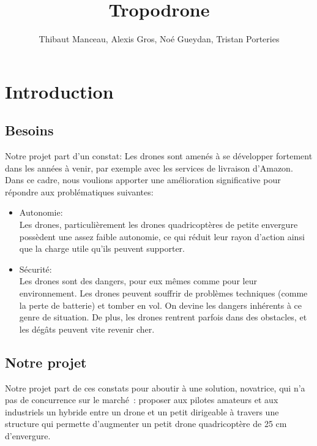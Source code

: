 \documentclass[a4paper,11pt]{article}
\title{Tropodrone}
\author{Thibaut Manceau, Alexis Gros, Noé Gueydan, Tristan Porteries}
\begin{document}
\begin{Huge}
\maketitle
\end{Huge}

\clearpage

\tableofcontents

\clearpage

\section{Introduction}

\subsection{Besoins}
Notre projet part d'un constat: Les drones sont amenés à se développer fortement dans les années à venir, par exemple avec les services de livraison d'Amazon. Dans ce cadre, nous voulions apporter une amélioration significative pour répondre aux problématiques suivantes:
\begin{itemize}
	\item Autonomie: \\
		Les drones, particulièrement les drones quadricoptères de petite envergure possèdent une assez faible autonomie, ce qui réduit leur rayon d'action ainsi que la charge utile qu'ils peuvent supporter.
	\item Sécurité: \\
		Les drones sont des dangers, pour eux mêmes comme pour leur environnement. Les drones peuvent souffrir de problèmes techniques (comme la perte de batterie) et tomber en vol. On devine les dangers inhérents à ce genre de situation. De plus, les drones rentrent parfois dans des obstacles, et les dégâts peuvent vite revenir cher.
\end{itemize}

\subsection{Notre projet}
Notre projet part de ces constats pour aboutir à une solution, novatrice, qui n'a pas de concurrence sur le marché~: proposer aux pilotes amateurs et aux industriels un hybride entre un drone et un petit dirigeable à travers une structure qui permette d'augmenter un petit drone quadricoptère de 25 cm d'envergure.
\end{document}
